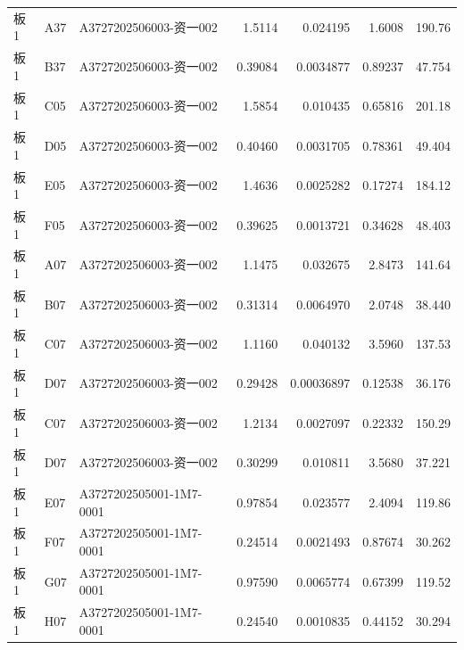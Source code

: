 \documentclass[UTF8,10pt,a4paper,fontset=fandol]{ctexart}
\begin{document}
\begin{tabularx}{\textwidth}{@{}llXrrrr@{}}
\small
板1 & A37 & A3727202506003-\newline 资一002 & 1.5114 & 0.024195 & 1.6008 & 190.76 \\
板1 & B37 & A3727202506003-\newline 资一002 & 0.39084 & 0.0034877 & 0.89237 & 47.754 \\
板1 & C05 & A3727202506003-\newline 资一002 & 1.5854 & 0.010435 & 0.65816 & 201.18 \\
板1 & D05 & A3727202506003-\newline 资一002 & 0.40460 & 0.0031705 & 0.78361 & 49.404 \\
板1 & E05 & A3727202506003-\newline 资一002 & 1.4636 & 0.0025282 & 0.17274 & 184.12 \\
板1 & F05 & A3727202506003-\newline 资一002 & 0.39625 & 0.0013721 & 0.34628 & 48.403 \\
板1 & A07 & A3727202506003-\newline 资一002 & 1.1475 & 0.032675 & 2.8473 & 141.64 \\
板1 & B07 & A3727202506003-\newline 资一002 & 0.31314 & 0.0064970 & 2.0748 & 38.440 \\
板1 & C07 & A3727202506003-\newline 资一002 & 1.1160 & 0.040132 & 3.5960 & 137.53 \\
板1 & D07 & A3727202506003-\newline 资一002 & 0.29428 & 0.00036897 & 0.12538 & 36.176 \\
板1 & C07 & A3727202506003-\newline 资一002 & 1.2134 & 0.0027097 & 0.22332 & 150.29 \\
板1 & D07 & A3727202506003-\newline 资一002 & 0.30299 & 0.010811 & 3.5680 & 37.221 \\
板1 & E07 & A3727202505001-\newline 1M7-0001 & 0.97854 & 0.023577 & 2.4094 & 119.86 \\
板1 & F07 & A3727202505001-\newline 1M7-0001 & 0.24514 & 0.0021493 & 0.87674 & 30.262 \\
板1 & G07 & A3727202505001-\newline 1M7-0001 & 0.97590 & 0.0065774 & 0.67399 & 119.52 \\
板1 & H07 & A3727202505001-\newline 1M7-0001 & 0.24540 & 0.0010835 & 0.44152 & 30.294 \\

\end{tabularx}
\end{document}
